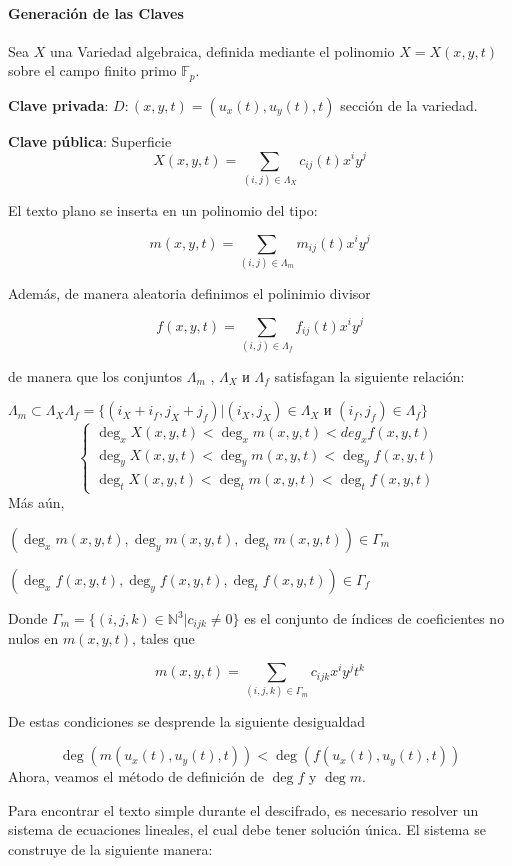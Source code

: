\documentclass[12pt]{article}
\begin{document}
 
 

\paragraph*{Generaci\'on de las Claves}

Sea $X$ una Variedad algebraica, definida mediante el polinomio $X=X(x,y,t)$ sobre el campo finito primo $\mathbb{F}_p$. 


\textbf{Clave privada}: $D : (x, y, t) = (u_x (t), u_y (t), t)$ secci\'on de la variedad.

\textbf{Clave p\'ublica}: Superficie
$$X(x, y, t) = \sum_{(i,j)\in\Lambda_X} c_{ij} (t)x^i y^j $$


El texto plano se inserta en un polinomio del tipo:

 $$m(x, y, t) =\sum_{(i,j)\in\Lambda_m} m_{ij} (t)x^i y^j$$

Adem\'as, de manera aleatoria definimos el polinimio divisor 

$$f(x, y, t) =\sum_{(i,j)\in\Lambda_f} f_{ij} (t)x^i y^j$$

de manera que los conjuntos $\Lambda_m$ , $\Lambda_X$ и $\Lambda_f$ satisfagan la siguiente relaci\'on:

$\Lambda_m\subset\Lambda_X \Lambda_f = \{(i_X + i_f , j_X + j_f )|(i_X , j_X ) \in\Lambda_X$ и $(i_f , j_f ) \in\Lambda_f \}$
$$
\begin{cases}
\deg_x X(x, y, t) < \deg_x m(x, y, t) < deg_x f (x, y, t)\\
\deg_y X(x, y, t) < \deg_y m(x, y, t) < \deg_y f (x, y, t)\\
\deg_t X(x, y, t) < \deg_t m(x, y, t) < \deg_t f (x, y, t)
\end{cases}
$$
M\'as a\'un,

$(\deg_x m(x,y,t),\deg_y m(x,y,t),\deg_t m(x,y,t))\in\Gamma_m$

$(\deg_x f(x,y,t),\deg_y f(x,y,t),\deg_t f(x,y,t))\in\Gamma_f$

Donde $\Gamma_m = \{(i,j,k)\in\mathbb{N}^3 | c_{ijk}\neq 0\}$ es el conjunto de \'indices de coeficientes no nulos en  $m(x,y,t)$, tales que 


$$m(x, y, t) = \sum_{(i,j,k)\in\Gamma_m} c_{ijk} x^{i} y^{j} t^{k} $$

De estas condiciones se desprende la siguiente desigualdad


$$\deg(m(u_x(t),u_y(t),t)) < \deg(f(u_x(t),u_y(t),t))$$
Ahora, veamos el m\'etodo de definici\'on de $\deg f$ y $\deg m$.


Para encontrar el texto simple durante el descifrado, es necesario resolver un sistema de ecuaciones lineales, el cual debe tener soluci\'on \'unica. El sistema se construye de la siguiente manera:
\end{document}
